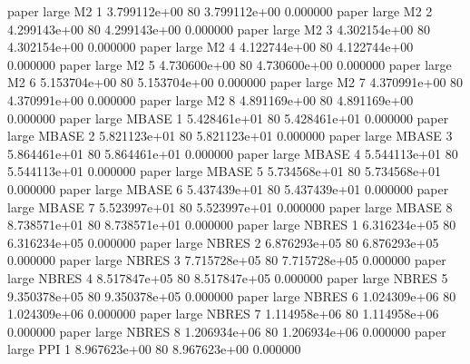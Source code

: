               paper      large       M2                 1 3.799112e+00 80   3.799112e+00           0.000000
              paper      large       M2                 2 4.299143e+00 80   4.299143e+00           0.000000
              paper      large       M2                 3 4.302154e+00 80   4.302154e+00           0.000000
              paper      large       M2                 4 4.122744e+00 80   4.122744e+00           0.000000
              paper      large       M2                 5 4.730600e+00 80   4.730600e+00           0.000000
              paper      large       M2                 6 5.153704e+00 80   5.153704e+00           0.000000
              paper      large       M2                 7 4.370991e+00 80   4.370991e+00           0.000000
              paper      large       M2                 8 4.891169e+00 80   4.891169e+00           0.000000
              paper      large    MBASE                 1 5.428461e+01 80   5.428461e+01           0.000000
              paper      large    MBASE                 2 5.821123e+01 80   5.821123e+01           0.000000
              paper      large    MBASE                 3 5.864461e+01 80   5.864461e+01           0.000000
              paper      large    MBASE                 4 5.544113e+01 80   5.544113e+01           0.000000
              paper      large    MBASE                 5 5.734568e+01 80   5.734568e+01           0.000000
              paper      large    MBASE                 6 5.437439e+01 80   5.437439e+01           0.000000
              paper      large    MBASE                 7 5.523997e+01 80   5.523997e+01           0.000000
              paper      large    MBASE                 8 8.738571e+01 80   8.738571e+01           0.000000
              paper      large    NBRES                 1 6.316234e+05 80   6.316234e+05           0.000000
              paper      large    NBRES                 2 6.876293e+05 80   6.876293e+05           0.000000
              paper      large    NBRES                 3 7.715728e+05 80   7.715728e+05           0.000000
              paper      large    NBRES                 4 8.517847e+05 80   8.517847e+05           0.000000
              paper      large    NBRES                 5 9.350378e+05 80   9.350378e+05           0.000000
              paper      large    NBRES                 6 1.024309e+06 80   1.024309e+06           0.000000
              paper      large    NBRES                 7 1.114958e+06 80   1.114958e+06           0.000000
              paper      large    NBRES                 8 1.206934e+06 80   1.206934e+06           0.000000
              paper      large      PPI                 1 8.967623e+00 80   8.967623e+00           0.000000
